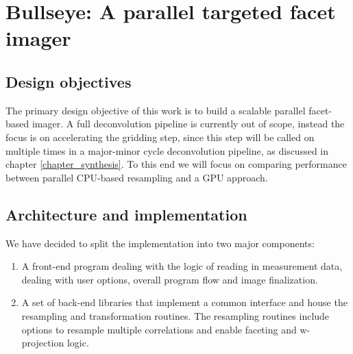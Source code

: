 \chapter{Bullseye: A parallel targeted facet imager}
\section{Design objectives}
The primary design objective of this work is to build a scalable parallel facet-based imager. A full deconvolution pipeline is currently out of scope, instead 
the focus is on accelerating the gridding step, since this step will be called on multiple times in a major-minor cycle deconvolution pipeline, as discussed in 
chapter \ref{chapter_synthesis}. To this end we will focus on comparing performance between parallel CPU-based resampling and a GPU approach.

\section{Architecture and implementation}
We have decided to split the implementation into two major components:
\begin{enumerate}
 \item A front-end program dealing with the logic of reading in measurement data, dealing with user options, overall program flow and image finalization.
 \item A set of back-end libraries that implement a common interface and house the resampling and transformation routines. The resampling routines include options to resample multiple
 correlations and enable faceting and w-projection logic.
\end{enumerate}

